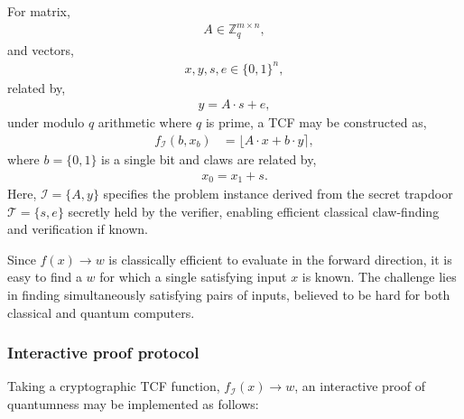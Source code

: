 \documentclass[twocolumn, aps, amsmath, amssymb, nofootinbib, superscriptaddress, longbibliography, floatfix, eqsecnum, rmp]{revtex4-2}
\begin{document}
For matrix,
\begin{align}
	A\in\mathbb{Z}_q^{m\times n},
\end{align}
and vectors,
\begin{align}
	x,y,s,e\in\{0,1\}^n,
\end{align}
related by,
\begin{align}
	y = A\cdot s + e,
\end{align}
under modulo $q$ arithmetic where $q$ is prime, a TCF may be constructed as,
\begin{align}
	f_\mathcal{I}(b,x_b) &= \lfloor A\cdot x + b\cdot y\rceil,
\end{align}
where $b=\{0,1\}$ is a single bit and claws are related by,
\begin{align}
	x_0=x_1+s.
\end{align}
Here, $\mathcal{I}=\{A,y\}$ specifies the problem instance derived from the secret trapdoor $\mathcal{T}=\{s,e\}$ secretly held by the verifier, enabling efficient classical claw-finding and verification if known.

Since $f(x)\to w$ is classically efficient to evaluate in the forward direction, it is easy to find a $w$ for which a single satisfying input $x$ is known. The challenge lies in finding simultaneously satisfying pairs of inputs, believed to be hard for both classical and quantum computers.

\subsubsection{Interactive proof protocol}

Taking a cryptographic TCF function, $f_\mathcal{I}(x)\to w$, an interactive proof of quantumness may be implemented as follows:
\end{document}
